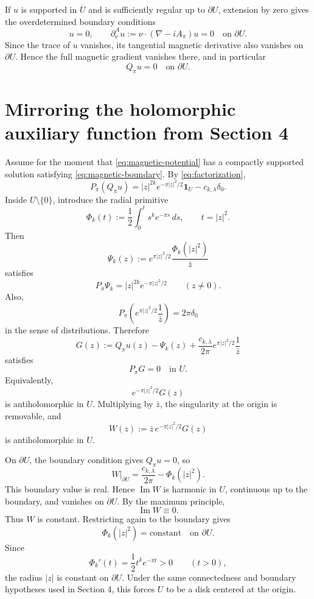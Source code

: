 \documentclass[11pt]{article}
\newcommand{\1}{\mathbf 1}
\begin{document}
If \(u\) is supported in \(\overline U\) and is sufficiently regular up to
\(\partial U\), extension by zero gives the overdetermined boundary conditions
\begin{equation}\label{eq:magnetic-boundary}
        u=0,
        \qquad
        \partial_\nu^A u:=\nu\cdot(\nabla-iA_\pi)u=0
        \quad\text{on }\partial U.
\end{equation}
Since the trace of \(u\) vanishes, its tangential magnetic derivative also
vanishes on \(\partial U\).  Hence the full magnetic gradient vanishes there,
and in particular
\[
        Q_\pi u=0
        \quad\text{on }\partial U .
\]

\section{Mirroring the holomorphic auxiliary function from Section 4}

Assume for the moment that \eqref{eq:magnetic-potential} has a compactly
supported solution satisfying \eqref{eq:magnetic-boundary}.  By
\eqref{eq:factorization},
\[
        P_\pi(Q_\pi u)
        =
        |z|^{2k}e^{-\pi |z|^2/2}\1_U
        -
        c_{k,\lambda}\delta_0 .
\]
Inside \(U\setminus\{0\}\), introduce the radial primitive
\[
        \Phi_k(t):=\frac12\int_0^t s^k e^{-\pi s}\,ds,
        \qquad t=|z|^2.
\]
Then
\[
        \Psi_k(z):=
        e^{\pi |z|^2/2}\frac{\Phi_k(|z|^2)}{\bar z}
\]
satisfies
\begin{equation}\label{eq:P-primitive}
        P_\pi\Psi_k
        =
        |z|^{2k}e^{-\pi |z|^2/2}
        \qquad (z\ne 0).
\end{equation}
Also,
\[
        P_\pi\left(e^{\pi |z|^2/2}\frac1{\bar z}\right)
        =
        2\pi\delta_0
\]
in the sense of distributions.  Therefore
\[
        G(z):=
        Q_\pi u(z)-\Psi_k(z)
        +\frac{c_{k,\lambda}}{2\pi}
        e^{\pi |z|^2/2}\frac1{\bar z}
\]
satisfies
\[
        P_\pi G=0
        \quad\text{in }U.
\]
Equivalently,
\[
        e^{-\pi |z|^2/2}G(z)
\]
is antiholomorphic in \(U\).  Multiplying by \(\bar z\), the singularity at the
origin is removable, and
\[
        W(z):=\bar z\,e^{-\pi |z|^2/2}G(z)
\]
is antiholomorphic in \(U\).

On \(\partial U\), the boundary condition gives \(Q_\pi u=0\), so
\[
        W|_{\partial U}
        =
        \frac{c_{k,\lambda}}{2\pi}
        -
        \Phi_k(|z|^2).
\]
This boundary value is real.  Hence \(\operatorname{Im}W\) is harmonic in \(U\),
continuous up to the boundary, and vanishes on \(\partial U\).  By the maximum
principle,
\[
        \operatorname{Im}W\equiv 0.
\]
Thus \(W\) is constant.  Restricting again to the boundary gives
\[
        \Phi_k(|z|^2)=\text{constant}
        \quad\text{on }\partial U.
\]
Since
\[
        \Phi_k'(t)=\frac12t^k e^{-\pi t}>0
        \qquad (t>0),
\]
the radius \(|z|\) is constant on \(\partial U\).  Under the same connectedness
and boundary hypotheses used in Section 4, this forces \(U\) to be a disk
centered at the origin.
\end{document}
